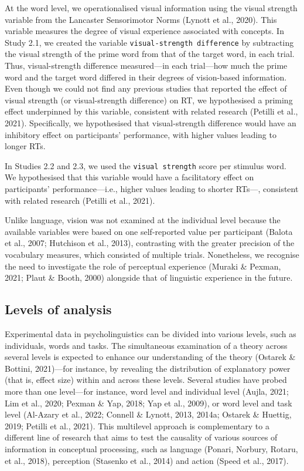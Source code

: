 \documentclass[
  12pt,
  man,floatsintext]{apa7}
\begin{document}
At the word level, we operationalised visual information using the visual strength variable from the Lancaster Sensorimotor Norms (Lynott et al., 2020). This variable measures the degree of visual experience associated with concepts. In Study 2.1, we created the variable \texttt{visual-strength\ difference} by subtracting the visual strength of the prime word from that of the target word, in each trial. Thus, visual-strength difference measured---in each trial---how much the prime word and the target word differed in their degrees of vision-based information. Even though we could not find any previous studies that reported the effect of visual strength (or visual-strength difference) on RT, we hypothesised a priming effect underpinned by this variable, consistent with related research (Petilli et al., 2021). Specifically, we hypothesised that visual-strength difference would have an inhibitory effect on participants' performance, with higher values leading to longer RTs.

In Studies 2.2 and 2.3, we used the \texttt{visual\ strength} score per stimulus word. We hypothesised that this variable would have a facilitatory effect on participants' performance---i.e., higher values leading to shorter RTs---, consistent with related research (Petilli et al., 2021).

Unlike language, vision was not examined at the individual level because the available variables were based on one self-reported value per participant (Balota et al., 2007; Hutchison et al., 2013), contrasting with the greater precision of the vocabulary measures, which consisted of multiple trials. Nonetheless, we recognise the need to investigate the role of perceptual experience (Muraki \& Pexman, 2021; Plaut \& Booth, 2000) alongside that of linguistic experience in the future.

\hypertarget{levels-of-analysis}{%
\subsection{Levels of analysis}\label{levels-of-analysis}}

Experimental data in psycholinguistics can be divided into various levels, such as individuals, words and tasks. The simultaneous examination of a theory across several levels is expected to enhance our understanding of the theory (Ostarek \& Bottini, 2021)---for instance, by revealing the distribution of explanatory power (that is, effect size) within and across these levels. Several studies have probed more than one level---for instance, word level and individual level (Aujla, 2021; Lim et al., 2020; Pexman \& Yap, 2018; Yap et al., 2009), or word level and task level (Al-Azary et al., 2022; Connell \& Lynott, 2013, 2014a; Ostarek \& Huettig, 2019; Petilli et al., 2021). This multilevel approach is complementary to a different line of research that aims to test the causality of various sources of information in conceptual processing, such as language (Ponari, Norbury, Rotaru, et al., 2018), perception (Stasenko et al., 2014) and action (Speed et al., 2017).
\end{document}

